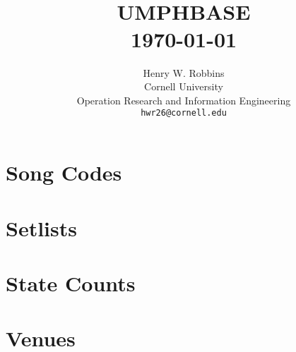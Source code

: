 \documentclass[8pt]{book}
\title{	\normalsize \textsc{} 	%
		 	\\[2.0cm]								%
			\HRule{2pt} \\ [0.5cm]		%
			\Huge \textbf{\uppercase{UMPHBASE}}	%
			\HRule{2pt} \\ [0.5cm]		%
			\large \today			%
		}
\author{
		Henry W. Robbins\\	
		Cornell University\\	
		Operation Research and Information Engineering\\
        \texttt{hwr26@cornell.edu} \\
}
\makeatletter
\def\printtitle{%
    {\centering \@title\par}}
\def\printauthor{%
    {\centering \large \@author}}
\makeatother
\begin{document}
\thispagestyle{empty}		%

\printtitle					%
  	\vfill
\printauthor				%
\newpage

\tableofcontents

\newpage

\chapter{Song Codes}

\begin{multicols*}{4}
 \let\mcnewpage=\newpage
     \makeatletter
     \renewcommand\newpage{
           \if@firstcolumn
                \hrule width \linewidth height0pt
                \columnbreak
            \else
                \mcnewpage
            \fi}
\begin{footnotesize}

\end{footnotesize}
\end{multicols*}

\chapter{Setlists}



\chapter{State Counts}

\begin{multicols*}{2}
 \let\mcnewpage=\newpage
     \makeatletter
     \renewcommand\newpage{
           \if@firstcolumn
                \hrule width \linewidth height0pt
                \columnbreak
            \else
                \mcnewpage
            \fi}

\end{multicols*}

\chapter{Venues}
\end{document}
